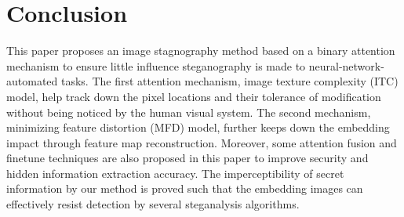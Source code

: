 \section{Conclusion}

This paper proposes an image stagnography method based on a binary attention mechanism to ensure little influence steganography is made to neural-network-automated tasks. The first attention mechanism, image texture complexity (ITC) model, help track down the pixel locations and their tolerance of modification without being noticed by the human visual system. The second mechanism, minimizing feature distortion (MFD) model, further keeps down the embedding impact through feature map reconstruction. Moreover, some attention fusion and finetune techniques are also proposed in this paper to improve security and hidden information extraction accuracy. The imperceptibility of secret information
by our method is proved such that the embedding images can effectively resist detection by several steganalysis algorithms.
